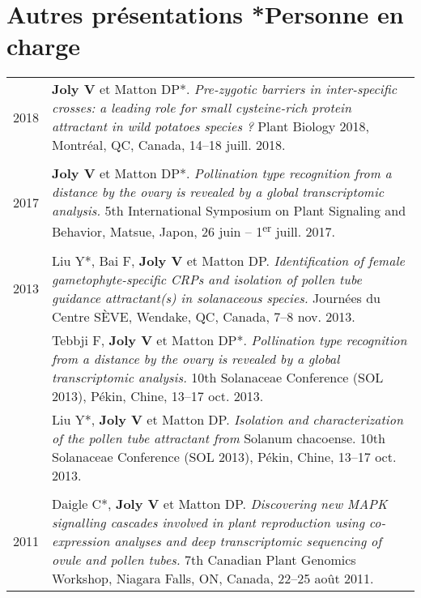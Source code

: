 \documentclass[letterpaper,12pt]{article}
\begin{document}
\vspace{6mm}

\section[Autres présentations]{Autres présentations
                               \hfill \small{*Personne en charge}}

\begin{tabularx}{\textwidth}{@{}r|X@{}}

2018

& \textbf{Joly V} et Matton DP*.
  \emph{Pre-zygotic barriers in inter-specific crosses: a leading role for small
  cysteine-rich protein attractant in wild potatoes species ?}
  Plant Biology 2018, Montréal, QC, Canada, 14--18 juill. 2018.
  \\

\multicolumn{2}{c}{} \\

2017

& \textbf{Joly V} et Matton DP*.
  \emph{Pollination type recognition from a distance by the ovary is revealed
  by a global transcriptomic analysis.}
  5th International Symposium on Plant Signaling and Behavior, Matsue, Japon,
  26 juin -- 1\textsuperscript{er} juill. 2017.
  \\

\multicolumn{2}{c}{} \\

2013

& Liu Y*, Bai F, \textbf{Joly V} et Matton DP.
  \emph{Identification of female gametophyte-specific CRPs and isolation of
  pollen tube guidance attractant(s) in solanaceous species.}
  Journées du Centre SÈVE, Wendake, QC, Canada, 7--8 nov. 2013.
  \vspace{1.5mm} \\

& Tebbji F, \textbf{Joly V} et Matton DP*. \emph{Pollination type recognition
  from a distance by the ovary is revealed by a global transcriptomic analysis.}
  10th Solanaceae Conference (SOL 2013), Pékin, Chine, 13--17 oct. 2013.
  \vspace{1.5mm} \\

& Liu Y*, \textbf{Joly V} et Matton DP.
  \emph{Isolation and characterization of the pollen tube attractant from}
  Solanum chacoense. 10th Solanaceae Conference (SOL 2013), Pékin, Chine,
  13--17 oct. 2013. \\

\multicolumn{2}{c}{} \\

2011

& Daigle C*, \textbf{Joly V} et Matton DP.
  \emph{Discovering new MAPK signalling cascades involved in plant reproduction
  using co-expression analyses and deep transcriptomic sequencing of ovule
  and pollen tubes.}
  7th Canadian Plant Genomics Workshop, Niagara Falls, ON, Canada,
  22--25 août 2011.
  \\

\end{tabularx}
\end{document}
